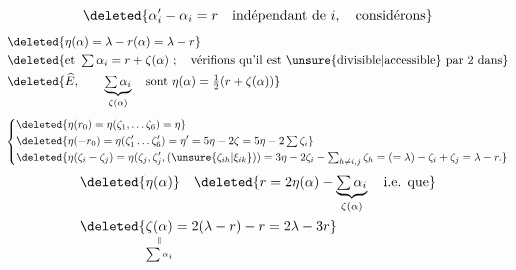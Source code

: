  
\[
\deleted{\alpha'_i-\alpha_i=r\quad \text{indépendant de }i, \quad\text{considérons}}
\]
\[
\begin{aligned}
&\deleted{\eta(\alpha)=\lambda-r(\alpha)=\lambda-r}\\
&\deleted{\text{et }\textstyle\sum\alpha_i=r+\zeta(\alpha)\ ;\quad\text{vérifions qu'il est \unsure{divisible|accessible} par 2 dans}}\\
&\deleted{\widehat E,\qquad\underbrace{\textstyle\sum\alpha_i}_{\zeta(\alpha)}\quad
 \text{sont }\eta(\alpha)=\tfrac12(r+\zeta(\alpha))}
\end{aligned}
\]
\[
\left\{\begin{aligned}
&\deleted{\eta(r_0)=\eta(\zeta_1,\ldots\zeta_6)=\eta}\\
&\deleted{\eta(-r_0)=\eta(\zeta'_1\ldots\zeta'_6)=\eta'=5\eta-2\zeta=5\eta-2\textstyle\sum\zeta_i}\\
&\deleted{\eta(\zeta_i-\zeta_j)=\eta(\zeta_j,\zeta'_j,(\unsure{\zeta_{ih}|\xi_{ik}}))=3\eta-2\zeta_i-\textstyle\sum_{h\ne i,j}\zeta_h=(=\lambda)-\zeta_i+\zeta_j=\lambda-r.}
\end{aligned}\right.
\]
\[
\begin{aligned}
&\deleted{\eta(\alpha)}\quad\deleted{r=2\eta(\alpha)-\underbrace{\textstyle\sum\alpha_i}_{\zeta(\alpha)}\quad\text{i.e. que}}\\
&\deleted{\underset{\scriptscriptstyle\sum\alpha_i}{\underset{\scriptscriptstyle\Vert}{\zeta(\alpha)}}=2(\lambda-r)-r=2\lambda-3r}
\end{aligned}
\]
